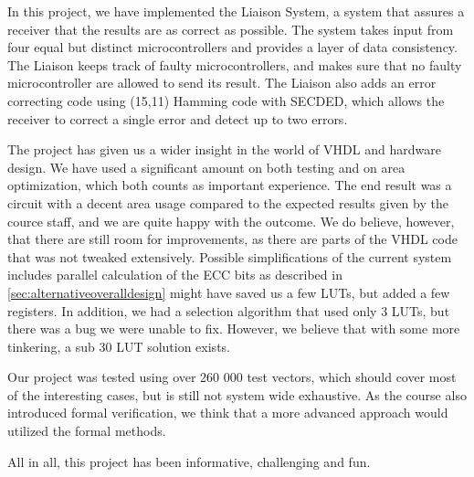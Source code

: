 In this project, we have implemented the Liaison System, a system that assures a receiver that the results are as correct as possible.
The system takes input from four equal but distinct microcontrollers and provides a layer of data consistency. The Liaison keeps track
of faulty microcontrollers, and makes sure that no faulty microcontroller are allowed to send its result. The Liaison also adds an error
correcting code using (15,11) Hamming code with SECDED, which allows the receiver to correct a single error and detect up to two errors.

The project has given us a wider insight in the world of VHDL and hardware design. We have used a significant amount on both testing and
on area optimization, which both counts as important experience. The end result was a circuit with a decent area usage compared to the
expected results given by the cource staff, and we are quite happy with the outcome. We do believe, however, that there are still room for
improvements, as there are parts of the VHDL code that was not tweaked extensively. Possible simplifications of the current system includes
parallel calculation of the ECC bits as described in \autoref{sec:alternativeoveralldesign} might have saved us a few LUTs, but added a few
registers. In addition, we had a selection algorithm that used only 3 LUTs, but there was a bug we were unable to fix. However, we believe
that with some more tinkering, a sub 30 LUT solution exists.

Our project was tested using over 260 000 test vectors, which should cover most of the interesting cases, but is still not system wide
exhaustive. As the course also introduced formal verification, we think that a more advanced approach would utilized the formal methods.

All in all, this project has been informative, challenging and fun.
